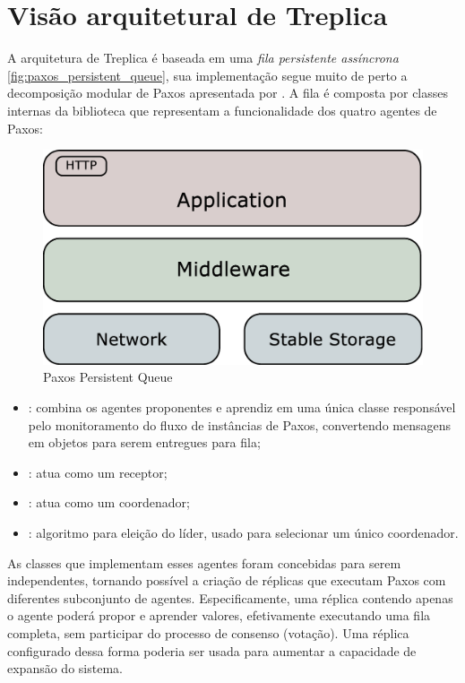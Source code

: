 \section{Visão arquitetural de Treplica}\label{sec:visao_arquitetural}

A arquitetura de Treplica é baseada em uma \emph{fila persistente assíncrona}
\autoref{fig:paxos_persistent_queue}, sua implementação segue muito de perto a
decomposição modular de Paxos apresentada por . A fila é composta
por classes internas da biblioteca que representam a funcionalidade dos quatro agentes
de Paxos:

\begin{figure}[ht]
  \centering
  \includegraphics[width=12cm]{conteudo/capitulos/figuras/block-simple.eps}
  \caption{Paxos Persistent Queue}
  \label{fig:paxos_persistent_queue}
\end{figure}

\begin{itemize}
  \item {}: combina os agentes proponentes e aprendiz em uma única classe
    responsável pelo monitoramento do fluxo de instâncias de Paxos, convertendo
    mensagens em objetos para serem entregues para fila;
  \item {}: atua como um receptor;
  \item {}: atua como um coordenador;
  \item {}: algoritmo para eleição do líder, usado para selecionar um
    único coordenador.
\end{itemize}

As classes que implementam esses agentes foram concebidas para serem independentes,
tornando possível a criação de réplicas que executam Paxos com diferentes subconjunto de
agentes. Especificamente, uma réplica contendo apenas o agente  poderá
propor e aprender valores, efetivamente executando uma fila completa, sem participar do
processo de consenso (votação). Uma réplica configurado dessa forma poderia ser usada para
aumentar a capacidade de expansão do sistema.

